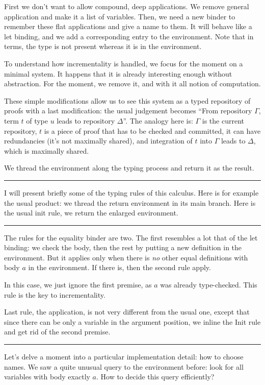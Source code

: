 \documentclass[12pt]{article}
\newcommand{\slide}{\vspace{1em} \hrule \vspace{1em}}
\begin{document}
First we don't want to allow compound, deep applications. We remove
general application and make it a list of variables. Then, we need a
new binder to remember these flat applications and give a name to
them. It will behave like a \textsf{let} binding, and we add a
corresponding entry to the environment. Note that in terms, the type
is not present whereas it is in the environment.

To understand how incrementality is handled, we focus for the moment
on a minimal system. It happens that it is already interesting enough
without abstraction. For the moment, we remove it, and with it all
notion of computation.

These simple modifications allow us to see this system as a typed
repository of proofs with a last modification: the usual judgement
becomes ``From repository $\Gamma$, term $t$ of type $u$ leads to
repository $\Delta$''. The analogy here is: $\Gamma$ is the current
repository, $t$ is a piece of proof that has to be checked and
committed, it can have redundancies (it's not maximally shared), and
integration of $t$ into $\Gamma$ leads to $\Delta$, which is maximally
shared.

We thread the environment along the typing process and return it as
the result.

\slide

I will present briefly some of the typing rules of this calculus. Here
is for example the usual product: we thread the return environment in
its main branch. Here is the usual init rule, we return the enlarged
environment.

\slide

The rules for the equality binder are two. The first resembles a lot
that of the \textsf{let} binding: we check the body, then the rest by
putting a new definition in the environment. But it applies only when
there is \emph{no} other equal definitions with body $a$ in the
environment. If there is, then the second rule apply.

In this case, we just ignore the first premise, as $a$ was already
type-checked. This rule is the key to incrementality.

Last rule, the application, is not very different from the usual one,
except that since there can be only a variable in the argument
position, we inline the Init rule and get rid of the second premise.

\slide

Let's delve a moment into a particular implementation detail: how to
choose names. We saw a quite unusual query to the environment before:
look for all variables with body exactly $a$. How to decide this query
efficiently?
\end{document}
